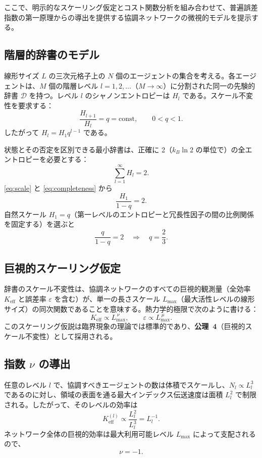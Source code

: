 \documentclass[11pt,a4paper]{article}
\newcommand{\Dir}{\mathcal{D}}
\begin{document}
	ここで、明示的なスケーリング仮定とコスト関数分析を組み合わせて、普遍誤差指数の第一原理からの導出を提供する協調ネットワークの微視的モデルを提示する。
	
	\subsection{階層的辞書のモデル}
	線形サイズ \(L\) の三次元格子上の \(N\) 個のエージェントの集合を考える。各エージェントは、\(M\) 個の階層レベル \(l = 1,2,\dots\)（\(M \to \infty\)）に分割された同一の先験的辞書 \(\Dir\) を持つ。レベル \(l\) のシャノンエントロピーは \(H_l\) である。スケール不変性を要求する：
	\begin{equation}
		\frac{H_{l+1}}{H_l} = q = \text{const}, \qquad 0 < q < 1. \label{eq:scale}
	\end{equation}
	したがって \(H_l = H_1 q^{l-1}\) である。
	
	状態とその否定を区別できる最小辞書は、正確に 2（\(k_B \ln 2\) の単位で）の全エントロピーを必要とする：
	\begin{equation}
		\sum_{l=1}^{\infty} H_l = 2. \label{eq:completeness}
	\end{equation}
	\eqref{eq:scale} と \eqref{eq:completeness} から
	\[
	\frac{H_1}{1-q} = 2.
	\]
	自然スケール \(H_1 = q\)（第一レベルのエントロピーと冗長性因子の間の比例関係を固定する）を選ぶと
	\[
	\frac{q}{1-q} = 2 \quad\Longrightarrow\quad q = \frac{2}{3}. \label{eq:qval}
	\]
	
	\subsection{巨視的スケーリング仮定}
	辞書のスケール不変性は、協調ネットワークのすべての巨視的観測量（全効率 \(K_{\mathrm{eff}}\) と誤差率 \(\varepsilon\) を含む）が、単一の長さスケール \(L_{\max}\)（最大活性レベルの線形サイズ）の同次関数であることを意味する。熱力学的極限で次のように書ける：
	\begin{equation}
		K_{\mathrm{eff}} \propto L_{\max}^{\,\nu}, \qquad \varepsilon \propto L_{\max}^{\,\mu}. \label{eq:scaling-assume}
	\end{equation}
	このスケーリング仮説は臨界現象の理論では標準的であり、\textbf{公理~4}（巨視的スケール不変性）として採用される。
	
	\subsection{指数 \(\nu\) の導出}
	任意のレベル \(l\) で、協調すべきエージェントの数は体積でスケールし、\(N_l \propto L_l^3\) であるのに対し、領域の表面を通る最大インデックス伝送速度は面積 \(L_l^2\) で制限される。したがって、そのレベルの効率は
	\[
	K_{\mathrm{eff}}^{(l)} \propto \frac{L_l^2}{L_l^3} = L_l^{-1}.
	\]
	ネットワーク全体の巨視的効率は最大利用可能レベル \(L_{\max}\) によって支配されるので、
	\[
	\nu = -1. \label{eq:nu}
	\]
	
\end{document}

